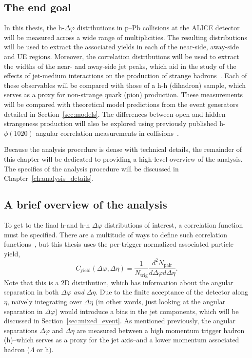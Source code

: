\subsection{The end goal}

In this thesis, the h-\lmb $\Delta\varphi$ distributions in p--Pb collisions at the ALICE detector will be measured across a wide range of multiplicities. The resulting distributions will be used to extract the associated \lmb yields in each of the near-side, away-side and UE regions. Moreover, the correlation distributions will be used to extract the widths of the near- and away-side jet peaks, which aid in the study of the effects of jet-medium interactions on the production of strange hadrons~\cite{DeepaPaper, DPaper}. Each of these observables will be compared with those of a h-h (dihadron) sample, which serves as a proxy for non-strange quark (pion) production. These measurements will be compared with theoretical model predictions from the event generators detailed in Section~\ref{sec:models}. The differences between open and hidden strangeness production will also be explored using previously published h-$\phi(1020)$ angular correlation measurements in \pPb collisions~\cite{JustinPaper}. 

Because the analysis procedure is dense with technical details, the remainder of this chapter will be dedicated to providing a high-level overview of the analysis. The specifics of the analysis procedure will be discussed in Chapter~\ref{ch:analysis_details}.

\subsection{A brief overview of the analysis}
\label{sec:analysis}

To get to the final h-\lmb and h-h $\Delta\varphi$ distributions of interest, a correlation function must be specified. There are a multitude of ways to define such correlation functions~\cite{CorrelationFunction}, but this thesis uses the per-trigger normalized associated particle yield,
\begin{equation}
    C_{\text{yield}}(\Delta\varphi, \Delta\eta) = \frac{1}{N_{\text{trig}}}\frac{d^2N_{\text{pair}}}{d\Delta\varphi d\Delta\eta}.
\label{eq:corr}
\end{equation}
Note that this is a 2D distribution, which has information about the angular separation in both $\Delta\varphi$ \textit{and} $\Delta\eta$. Due to the finite acceptance of the detector along $\eta$, na\"ively integrating over $\Delta\eta$ (in other words, just looking at the angular separation in $\Delta\varphi$) would introduce a bias in the jet components, which will be discussed in Section~\ref{sec:mixed_event}. As mentioned previously, the angular separations $\Delta\varphi$ and $\Delta\eta$ are measured between a high momentum trigger hadron (h)--which serves as a proxy for the jet axis--and a lower momentum associated hadron ($\Lambda$ or h). 

